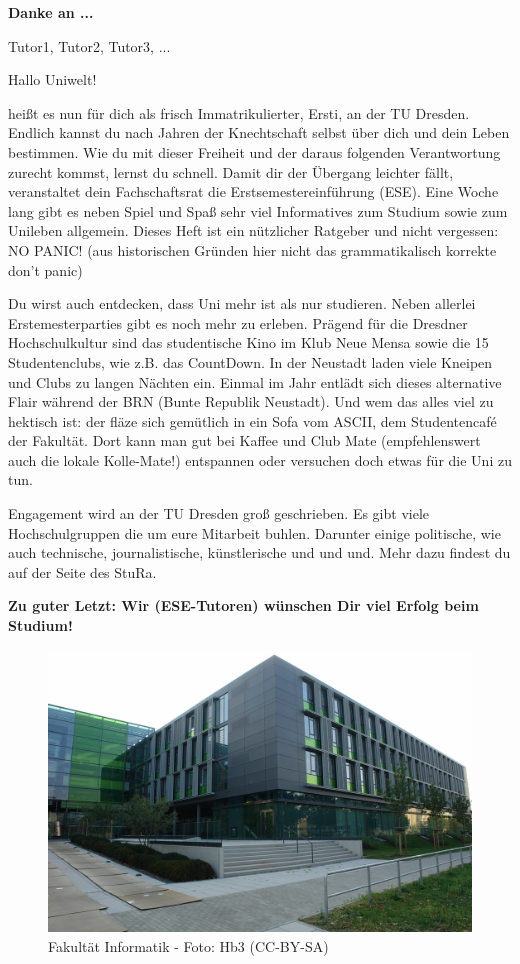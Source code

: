 \textbf{Danke an ...}

Tutor1, Tutor2, Tutor3, ...



Hallo Uniwelt!

heißt es nun für dich als frisch Immatrikulierter, Ersti, an der TU Dresden. 
Endlich kannst du nach Jahren der Knechtschaft selbst über dich und dein Leben bestimmen. 
Wie du mit dieser Freiheit und der daraus folgenden Verantwortung zurecht kommst, lernst du schnell. 
Damit dir der Übergang leichter fällt, veranstaltet dein Fachschaftsrat die Erstsemestereinführung (ESE). 
Eine Woche lang gibt es neben Spiel und Spaß sehr viel Informatives zum Studium sowie zum Unileben allgemein. 
Dieses Heft ist ein nützlicher Ratgeber und nicht vergessen: 
NO PANIC! (aus historischen Gründen hier nicht das grammatikalisch korrekte \glqq don't panic\grqq)

Du wirst auch entdecken, dass Uni mehr ist als nur studieren. 
Neben allerlei Erstemesterparties gibt es noch mehr zu erleben. 
Prägend für die Dresdner Hochschulkultur sind das studentische Kino im Klub Neue Mensa sowie die 15 Studentenclubs, wie z.B. das CountDown. 
In der Neustadt laden viele Kneipen und Clubs zu langen Nächten ein. 
Einmal im Jahr entlädt sich dieses alternative Flair während der BRN (Bunte Republik Neustadt). 
Und wem das alles viel zu hektisch ist: der fläze sich gemütlich in ein Sofa vom ASCII, dem Studentencafé der Fakultät. 
Dort kann man gut bei Kaffee und Club Mate (empfehlenswert auch die lokale Kolle-Mate!) entspannen oder versuchen doch etwas für die Uni zu tun.

Engagement wird an der TU Dresden groß geschrieben. 
Es gibt viele Hochschulgruppen die um eure Mitarbeit buhlen. 
Darunter einige politische, wie auch technische, journalistische, künstlerische und und und. Mehr dazu findest du auf der Seite des StuRa.

\textbf{Zu guter Letzt: Wir (ESE-Tutoren) wünschen Dir viel Erfolg beim Studium!}

\begin{figure}
\centering \includegraphics[width=\linewidth]{img/fakultaet.jpg}
\caption*{{\small Fakultät Informatik - Foto: Hb3 (CC-BY-SA)}}
\end{figure}

